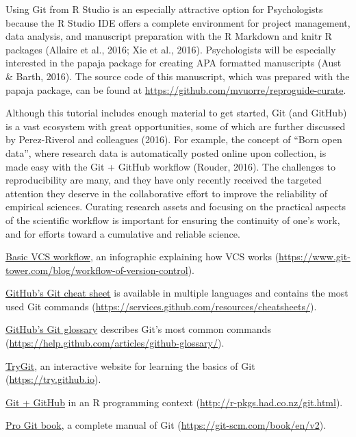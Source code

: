 \documentclass[
  american,
  ,doc,floatsintext]{apa6}
\begin{document}
Using Git from R Studio is an especially attractive option for Psychologists because the R Studio IDE offers a complete environment for project management, data analysis, and manuscript preparation with the R Markdown and knitr R packages (Allaire et al., 2016; Xie et al., 2016). Psychologists will be especially interested in the papaja package for creating APA formatted manuscripts (Aust \& Barth, 2016). The source code of this manuscript, which was prepared with the papaja package, can be found at \url{https://github.com/mvuorre/reproguide-curate}.

Although this tutorial includes enough material to get started, Git (and GitHub) is a vast ecosystem with great opportunities, some of which are further discussed by Perez-Riverol and colleagues (2016). For example, the concept of \enquote{Born open data}, where research data is automatically posted online upon collection, is made easy with the Git + GitHub workflow (Rouder, 2016). The challenges to reproducibility are many, and they have only recently received the targeted attention they deserve in the collaborative effort to improve the reliability of empirical sciences. Curating research assets and focusing on the practical aspects of the scientific workflow is important for ensuring the continuity of one's work, and for efforts toward a cumulative and reliable science.

\begin{tcolorbox}[colframe=green!50!black, colback=green!5, fonttitle=\small\bfseries, fontupper=\small, title=Box 4. Further resources for learning Git]
\begin{compactitem}
    \item \href{https://www.git-tower.com/blog/workflow-of-version-control}{Basic VCS workflow}, an infographic explaining how VCS works (\url{https://www.git-tower.com/blog/workflow-of-version-control}).
    \item \href{https://services.github.com/resources/cheatsheets/}{GitHub's Git cheat sheet} is available in multiple languages and contains the most used Git commands (\url{https://services.github.com/resources/cheatsheets/}).
\item \href{https://help.github.com/articles/github-glossary/}{GitHub's Git glossary} describes Git's most common commands (\url{https://help.github.com/articles/github-glossary/}).
    \item \href{https://try.github.io}{TryGit}, an interactive website for learning the basics of Git (\url{https://try.github.io}).
    \item \href{http://r-pkgs.had.co.nz/git.html}{Git + GitHub} in an R programming context (\url{http://r-pkgs.had.co.nz/git.html}).
    \item \href{https://git-scm.com/book/en/v2}{Pro Git book}, a complete manual of Git (\url{https://git-scm.com/book/en/v2}).
\end{compactitem}
\end{tcolorbox}
\end{document}
